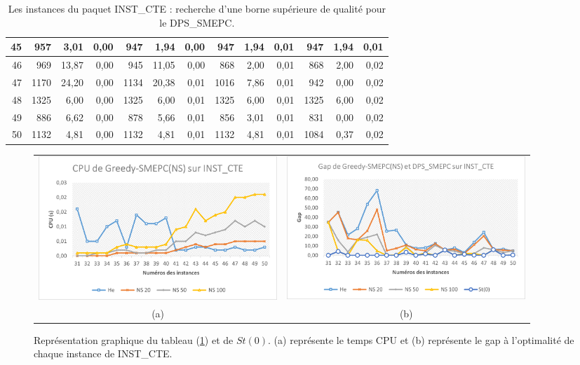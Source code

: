 \begin{table}[H]
\begin{tabular}{|r|rrr|rrr|rrr|rrr|}
		45	&	957	&	3,01	&	0,00	&	947	&	1,94	&	0,00	&	947	&	1,94	&	0,01	&	947	&	1,94	&	0,01	\\ \hline
		46	&	969	&	13,87	&	0,00	&	945	&	11,05	&	0,00	&	868	&	2,00	&	0,01	&	868	&	2,00	&	0,02	\\ \hline
		47	&	1170	&	24,20	&	0,00	&	1134	&	20,38	&	0,01	&	1016	&	7,86	&	0,01	&	942	&	0,00	&	0,02	\\ \hline
		48	&	1325	&	6,00	&	0,00	&	1325	&	6,00	&	0,01	&	1325	&	6,00	&	0,01	&	1325	&	6,00	&	0,02	\\ \hline
		49	&	886	&	6,62	&	0,00	&	878	&	5,66	&	0,01	&	856	&	3,01	&	0,01	&	831	&	0,00	&	0,02	\\ \hline
		50	&	1132	&	4,81	&	0,00	&	1132	&	4,81	&	0,01	&	1132	&	4,81	&	0,01	&	1084	&	0,37	&	0,02	\\ \hline
		
		\bottomrule
	\end{tabular}%
	\caption{Les instances du paquet INST\_CTE : recherche d'une borne supérieure de qualité pour le DPS\_SMEPC.}
	
	\label{Comparaison_DPS-SMEPC_greed2}%
\end{table}%

\begin{figure}[H]
	\centering
	\begin{tabular}{c c}
		\includegraphics[width=9cm]{images_these/CPU_NS_INST_CTE.pdf}&
		\includegraphics[width=9cm]{images_these/Gap_NS_INST_CTE.pdf}
		\\
		(a) & (b)
	\end{tabular}
	\caption[Représentation graphique du CPU et du gap du tableau (\ref{Comparaison_DPS-SMEPC_greed2})]{Représentation graphique du tableau (\ref{Comparaison_DPS-SMEPC_greed2}) et de $St(0)$. (a) représente le temps CPU et (b) représente le gap à l'optimalité de chaque instance de INST\_CTE.}\label{gap_cpu_NS_INST_CTE}
\end{figure}


